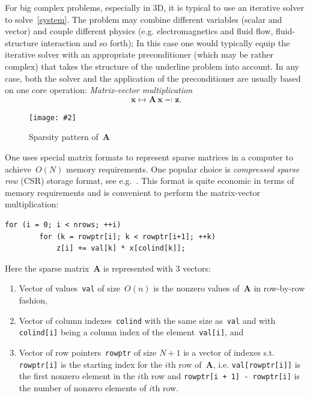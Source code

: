 \documentclass[12pt]{article}
\newcommand{\includegraphicsw}[2][1.]{\texttt{[image: \#2]}}
\newcommand{\vect}[1]{\boldsymbol{\mathbf{#1}}}
\newcommand{\dimSize}{N}
\begin{document}
For big complex problems, especially in 3D, it is typical to use an iterative solver to solve~\eqref{system}. The problem may combine different variables (scalar and vector) and couple different physics (e.g. electromagnetics and fluid flow, fluid-structure interaction and so forth); In this case one would typically equip the iterative solver with an appropriate preconditioner (which may be rather complex) that takes the structure of the underline problem into account. In any case, both the solver and the application of the preconditioner are usually based on one core operation: \textit{Matrix-vector multiplication}
\begin{equation}\label{mv}
	\vect x \mapsto \vect A\,\vect x \eqqcolon \vect z.
\end{equation}

\begin{figure}[H]
	\centering
	\includegraphicsw[.4]{sparse.pdf}
	\caption{Sparsity pattern of~$\vect A$}\label{fig:sparse}
\end{figure}

One uses special matrix formats to represent sparse matrices in a computer to achieve~$O(\dimSize)$ memory requirements. One popular choice is \textit{compressed sparse row} (CSR) storage format, see e.g.~\cite{saad2003iterative}. This format is quite economic in terms of memory requirements and is convenient to perform the matrix-vector multiplication:
\begin{lstlisting}[caption={Implementation of the sparse matrix-vector multiplication~\eqref{mv} for CSR format},label={lst:csrmv},captionpos=b]
	for (i = 0; i < nrows; ++i) 
		for (k = rowptr[i]; k < rowptr[i+1]; ++k)
			z[i] += val[k] * x[colind[k]];
\end{lstlisting}
Here the sparse matrix~$\vect A$ is represented with 3 vectors:
\begin{enumerate}
	\item Vector of values~\texttt{val} of size~$O(n)$ is the nonzero values of~$\vect A$ in row-by-row fashion,
	\item Vector of column indexes~\texttt{colind} with the same size as~\texttt{val} and with \texttt{colind[i]} being a column index of the element~\texttt{val[i]}, and 
	\item Vector of row pointers~\texttt{rowptr} of size $\dimSize + 1$ is a vector of indexes s.t. \texttt{rowptr[i]} is the starting index for the $i$th row of~$\vect A$, i.e. \texttt{val[rowptr[i]]} is the first nonzero element in the $i$th row and \texttt{rowptr[i + 1] - rowptr[i]} is the number of nonzero elements of $i$th row.
\end{enumerate}
\end{document}
